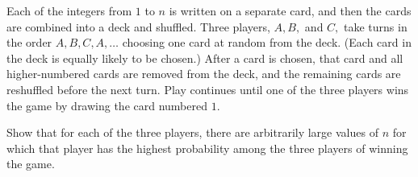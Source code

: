 Each of the integers from $1$ to $n$ is written on a separate card, and then the cards are combined into a deck and shuffled. Three players, $A,B,$ and $C,$ take turns in the order $A,B,C,A,\dots$ choosing one card at random from the deck. (Each card in the deck is equally likely to be chosen.) After a card is chosen, that card and all higher-numbered cards are removed from the deck, and the remaining cards are reshuffled before the next turn. Play continues until one of the three players wins the game by drawing the card numbered $1.$

Show that for each of the three players, there are arbitrarily large values of $n$ for which that player has the highest probability among the three players of winning the game.
